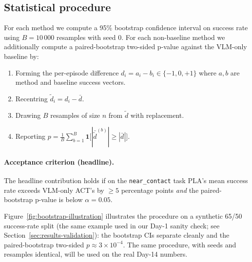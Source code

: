 \documentclass[11pt]{article}
\begin{document}
\subsection{Statistical procedure}
\label{sec:protocol-stats}

For each method we compute a 95\% bootstrap confidence interval on
success rate using $B = 10\,000$ resamples with seed $0$. For each
non-baseline method we additionally compute a paired-bootstrap
two-sided p-value against the VLM-only baseline by:
\begin{enumerate}[leftmargin=1.5em,topsep=0.2em,itemsep=0.2em]
\item Forming the per-episode difference $d_i = a_i - b_i \in \{-1, 0, +1\}$
  where $a, b$ are method and baseline success vectors.
\item Recentring $\tilde d_i = d_i - \bar d$.
\item Drawing $B$ resamples of size $n$ from $\tilde d$ with replacement.
\item Reporting $p = \frac{1}{B} \sum_{b=1}^{B} \mathbf{1}\!\big[ |\bar{\tilde d}^{(b)}| \geq |\bar d| \big]$.
\end{enumerate}

\paragraph{Acceptance criterion (headline).} The headline contribution
holds if on the \texttt{near\_contact} task PLA's mean success rate
exceeds VLM-only ACT's by $\geq 5$ percentage points \emph{and} the
paired-bootstrap p-value is below $\alpha = 0.05$.

Figure~\ref{fig:bootstrap-illustration} illustrates the procedure on a
synthetic 65/50 success-rate split (the same example used in our Day-1
sanity check; see Section~\ref{sec:results-validation}): the bootstrap
CIs separate cleanly and the paired-bootstrap two-sided $p \approx
3 \times 10^{-4}$. The same procedure, with seeds and resamples
identical, will be used on the real Day-14 numbers.
\end{document}
